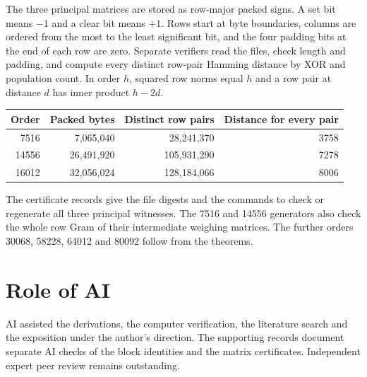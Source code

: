 \documentclass[10pt]{article}
\begin{document}
The three principal matrices are stored as row-major packed signs. A set bit means $-1$ and a clear bit means $+1$. Rows start at byte boundaries, columns are ordered from the most to the least significant bit, and the four padding bits at the end of each row are zero. Separate verifiers read the files, check length and padding, and compute every distinct row-pair Hamming distance by XOR and population count. In order $h$, squared row norms equal $h$ and a row pair at distance $d$ has inner product $h-2d$.
\begin{center}
\begin{tabular}{rrrr}
\toprule
Order & Packed bytes & Distinct row pairs & Distance for every pair\\
\midrule
7516 & 7,065,040 & 28,241,370 & 3758\\
14556 & 26,491,920 & 105,931,290 & 7278\\
16012 & 32,056,024 & 128,184,066 & 8006\\
\bottomrule
\end{tabular}
\end{center}
The certificate records give the file digests and the commands to check or regenerate all three principal witnesses. The 7516 and 14556 generators also check the whole row Gram of their intermediate weighing matrices. The further orders 30068, 58228, 64012 and 80092 follow from the theorems.

\section*{Role of AI}
AI assisted the derivations, the computer verification, the literature search and the exposition under the author's direction. The supporting records document separate AI checks of the block identities and the matrix certificates. Independent expert peer review remains outstanding.
\end{document}
